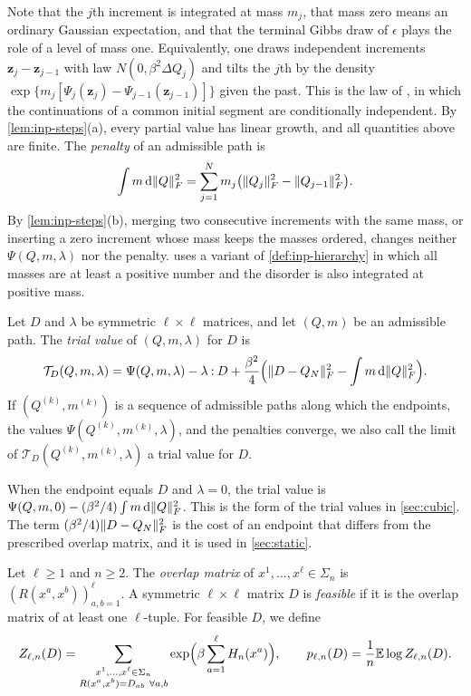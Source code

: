 Note that the $j$th increment is integrated at mass $m_j$, that mass zero means
an ordinary Gaussian expectation, and that the terminal Gibbs draw of $\epsilon$
plays the role of a level of mass one. Equivalently, one draws independent increments $\mathbf
z_j-\mathbf z_{j-1}$ with law $N(0,\beta^2\Delta Q_j)$ and tilts the $j$th by
the density $\exp\{m_j[\Psi_j(\mathbf z_j)-\Psi_{j-1}(\mathbf z_{j-1})]\}$
given the past. This is the law of \cite[(2.5)--(2.6)]{oai-barriers}, in which
the continuations of a common initial segment are conditionally independent. By
\cref{lem:inp-steps}(a), every partial value has linear growth, and all
quantities above are finite. The \emph{penalty} of an admissible path is
\begin{equation}\label{eq:inp-penalty}
 \int m\,\mathrm d\lVert Q\rVert_F^2=\sum_{j=1}^Nm_j\bigl(\lVert Q_j\rVert_F^2-\lVert Q_{j-1}\rVert_F^2\bigr).
\end{equation}
By \cref{lem:inp-steps}(b), merging two consecutive increments with the same
mass, or inserting a zero increment whose mass keeps the masses ordered,
changes neither $\Psi(Q,m,\lambda)$ nor the penalty. 
uses a variant of \cref{def:inp-hierarchy} in which all masses are at least a
positive number and the disorder is also integrated at positive mass.

\begin{definition}\label{def:inp-trial}
Let $D$ and $\lambda$ be symmetric $\ell\times\ell$ matrices, and let $(Q,m)$ be
an admissible path. The \emph{trial value} of $(Q,m,\lambda)$ for $D$ is
\begin{equation}\label{eq:inp-trial}
 \mathcal T_D(Q,m,\lambda)=\Psi(Q,m,\lambda)-\lambda\mathbin{:}D
 +\frac{\beta^2}{4}\Bigl(\lVert D-Q_N\rVert_F^2-\int m\,\mathrm d\lVert Q\rVert_F^2\Bigr).
\end{equation}
If $(Q^{(k)},m^{(k)})$ is a sequence of admissible paths along which the
endpoints, the values $\Psi(Q^{(k)},m^{(k)},\lambda)$, and the penalties
converge, we also call the limit of $\mathcal T_D(Q^{(k)},m^{(k)},\lambda)$ a
trial value for $D$.
\end{definition}

When the endpoint equals $D$ and $\lambda=0$, the trial value is
$\Psi(Q,m,0)-(\beta^2/4)\int m\,\mathrm d\lVert Q\rVert_F^2$. This is the form of the trial
values in \cref{sec:cubic}. The term $(\beta^2/4)\lVert D-Q_N\rVert_F^2$ is the cost
of an endpoint that differs from the prescribed overlap matrix, and it is used in
\cref{sec:static}.

\begin{definition}\label{def:inp-constrained}
Let $\ell\ge1$ and $n\ge2$. The \emph{overlap matrix} of
$x^1,\dots,x^\ell\in\Sigma_n$ is $(R(x^a,x^b))_{a,b=1}^\ell$. A symmetric
$\ell\times\ell$ matrix $D$ is \emph{feasible} if it is the overlap matrix of at
least one $\ell$-tuple. For feasible $D$, we define
\[
 Z_{\ell,n}(D)=\sum_{\substack{x^1,\dots,x^\ell\in\Sigma_n\\
 R(x^a,x^b)=D_{ab}\ \forall a,b}}
 \exp\Bigl(\beta\sum_{a=1}^\ell H_n(x^a)\Bigr),\qquad
 p_{\ell,n}(D)=\frac1n\mathbb E\log Z_{\ell,n}(D).
\]
\end{definition}


